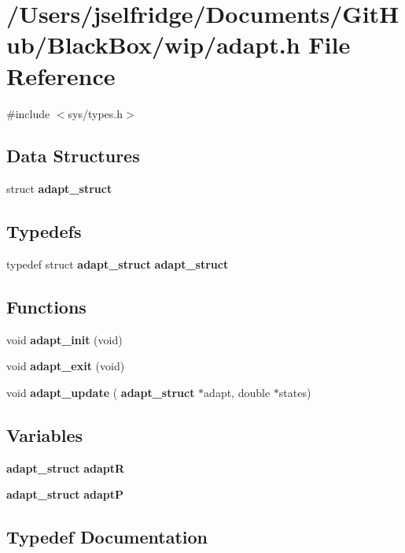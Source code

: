 \section{/\+Users/jselfridge/\+Documents/\+Git\+Hub/\+Black\+Box/wip/adapt.h File Reference}
\label{adapt_8h}
{\ttfamily \#include $<$sys/types.\+h$>$}\newline
\subsection*{Data Structures}
\begin{DoxyCompactItemize}
\item 
struct \textbf{ adapt\+\_\+struct}
\end{DoxyCompactItemize}
\subsection*{Typedefs}
\begin{DoxyCompactItemize}
\item 
typedef struct \textbf{ adapt\+\_\+struct} \textbf{ adapt\+\_\+struct}
\end{DoxyCompactItemize}
\subsection*{Functions}
\begin{DoxyCompactItemize}
\item 
void \textbf{ adapt\+\_\+init} (void)
\item 
void \textbf{ adapt\+\_\+exit} (void)
\item 
void \textbf{ adapt\+\_\+update} (\textbf{ adapt\+\_\+struct} $\ast$adapt, double $\ast$states)
\end{DoxyCompactItemize}
\subsection*{Variables}
\begin{DoxyCompactItemize}
\item 
\textbf{ adapt\+\_\+struct} \textbf{ adaptR}
\item 
\textbf{ adapt\+\_\+struct} \textbf{ adaptP}
\end{DoxyCompactItemize}


\subsection{Typedef Documentation}
\mbox{\label{adapt_8h_a51a6e2a82db6b2751b84bd9e67ce6ab6}} 
